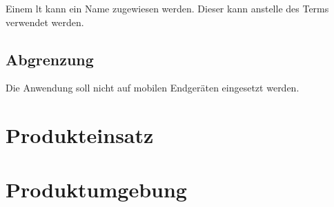\documentclass[parskip=full,11pt,twoside]{scrartcl}
\begin{document}
Einem \gls{lt} kann ein Name zugewiesen werden. Dieser kann anstelle des Terms
verwendet werden.


\subsection{Abgrenzung}

Die Anwendung soll nicht auf mobilen Endgeräten eingesetzt werden.

\pagebreak
\section{Produkteinsatz}

\section{Produktumgebung}

\end{document}
